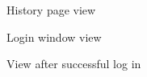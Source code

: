 \begin{figure}[ht!]
	\caption{History page view}
\label{fig:ui3}
\end{figure}

\begin{figure}[ht!]
	\caption{Login window view}
\label{fig:ui4}
\end{figure}

\begin{figure}[ht!]
	\caption{View after successful log in}
\label{fig:ui5}
\end{figure}

